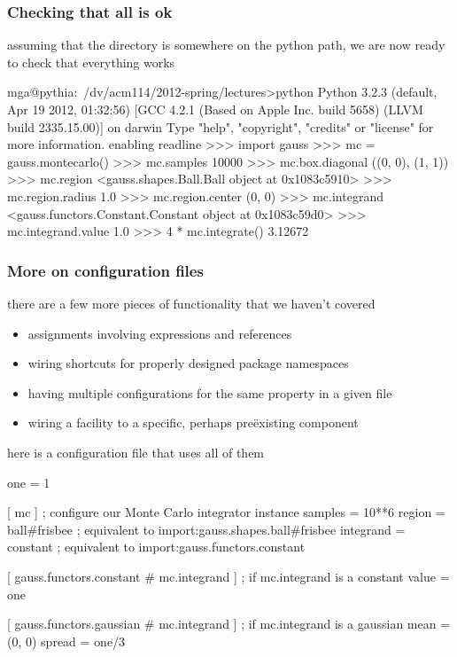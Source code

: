 \begin{frame}[fragile]
%
  \frametitle{Checking that all is ok}
%
  assuming that the directory  is somewhere on the python path, we are now ready
  to check that everything works
%
  \begin{ipython}{}
mga@pythia:~/dv/acm114/2012-spring/lectures>python
Python 3.2.3 (default, Apr 19 2012, 01:32:56) 
[GCC 4.2.1 (Based on Apple Inc. build 5658) (LLVM build 2335.15.00)] on darwin
Type "help", "copyright", "credits" or "license" for more information.
enabling readline
>>> import gauss
>>> mc = gauss.montecarlo()
>>> mc.samples
10000
>>> mc.box.diagonal
((0, 0), (1, 1))
>>> mc.region
<gauss.shapes.Ball.Ball object at 0x1083c5910>
>>> mc.region.radius
1.0
>>> mc.region.center
(0, 0)
>>> mc.integrand
<gauss.functors.Constant.Constant object at 0x1083c59d0>
>>> mc.integrand.value
1.0
>>> 4 * mc.integrate()
3.12672
  \end{ipython}
%
\end{frame}

\begin{frame}[fragile]
%
  \frametitle{More on configuration files}
%
  there are a few more pieces of functionality that we haven't covered
  \begin{itemize}
  \item assignments involving expressions and references
  \item wiring shortcuts for properly designed package namespaces
  \item having multiple configurations for the same property in a given file
  \item wiring a facility to a specific, perhaps pre\"existing component
  \end{itemize}
  here is a configuration file that uses all of them
%
  \begin{icfg}{}
one = 1

[ mc ] ; configure our Monte Carlo integrator instance
samples = 10**6
region = ball#frisbee ; equivalent to import:gauss.shapes.ball#frisbee
integrand = constant ; equivalent to import:gauss.functors.constant

[ gauss.functors.constant # mc.integrand ] ; if mc.integrand is a constant
value = {one}

[ gauss.functors.gaussian # mc.integrand ] ; if mc.integrand is a gaussian
mean = (0, 0)
spread = {one}/3
  \end{icfg}{}
%
\end{frame}

